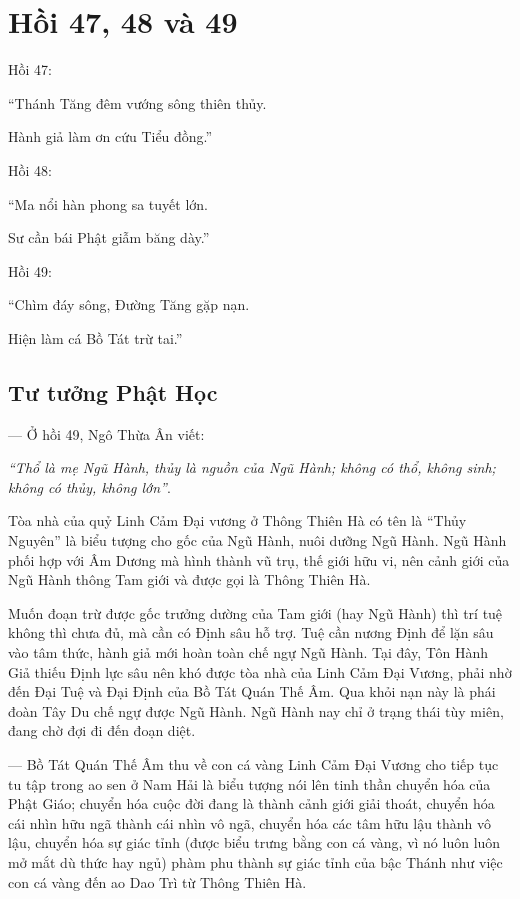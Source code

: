 \chapter{Hồi 47, 48 và 49} %
\label{cha:hoi_47_48}

Hồi 47:

\begin{itshape}
``Thánh Tăng đêm vướng sông thiên thủy.

Hành giả làm ơn cứu Tiểu đồng.''
\end{itshape}

Hồi 48:

\begin{itshape}
``Ma nổi hàn phong sa tuyết lớn.

Sư cần bái Phật giẫm băng dày.''
\end{itshape}

Hồi 49:

\begin{itshape}
``Chìm đáy sông, Đường Tăng gặp nạn.

Hiện làm cá Bồ Tát trừ tai.''
\end{itshape}

\section{Tư tưởng Phật Học} %
\label{sec:47_48_phat_hoc}

— Ở hồi 49, Ngô Thừa Ân viết:

\emph{``Thổ là mẹ Ngũ Hành, thủy là nguồn của Ngũ Hành; không có thổ, không sinh; không có thủy, không lớn''}.

Tòa nhà của quỷ Linh Cảm Đại vương ở Thông Thiên Hà có tên là ``Thủy Nguyên'' là biểu tượng cho gốc của Ngũ Hành, nuôi dưỡng Ngũ Hành. Ngũ Hành phối hợp với Âm Dương mà hình thành vũ trụ, thế giới hữu vi, nên cảnh giới của Ngũ Hành thông Tam giới và được gọi là Thông Thiên Hà.

Muốn đoạn trừ được gốc trưởng dường của Tam giới (hay Ngũ Hành) thì trí tuệ không thì chưa đủ, mà cần có Định sâu hỗ trợ. Tuệ cần nương Định để lặn sâu vào tâm thức, hành giả mới hoàn toàn chế ngự Ngũ Hành. Tại đây, Tôn Hành Giả thiếu Định lực sâu nên khó được tòa nhà của Linh Cảm Đại Vương, phải nhờ đến Đại Tuệ và Đại Định của Bồ Tát Quán Thế Âm. Qua khỏi nạn này là phái đoàn Tây Du chế ngự được Ngũ Hành. Ngũ Hành nay chỉ ở trạng thái tùy miên, đang chờ đợi đi đến đoạn diệt.

— Bồ Tát Quán Thế Âm thu về con cá vàng Linh Cảm Đại Vương cho tiếp tục tu tập trong ao sen ở Nam Hải là biểu tượng nói lên tinh thần chuyển hóa của Phật Giáo; chuyển hóa cuộc đời đang là thành cảnh giới giải thoát, chuyển hóa cái nhìn hữu ngã thành cái nhìn vô ngã, chuyển hóa các tâm hữu lậu thành vô lậu, chuyển hóa sự giác tỉnh (được biểu trưng bằng con cá vàng, vì nó luôn luôn mở mắt dù thức hay ngủ) phàm phu thành sự giác tỉnh của bậc Thánh như việc con cá vàng đến ao Dao Trì từ Thông Thiên Hà.

